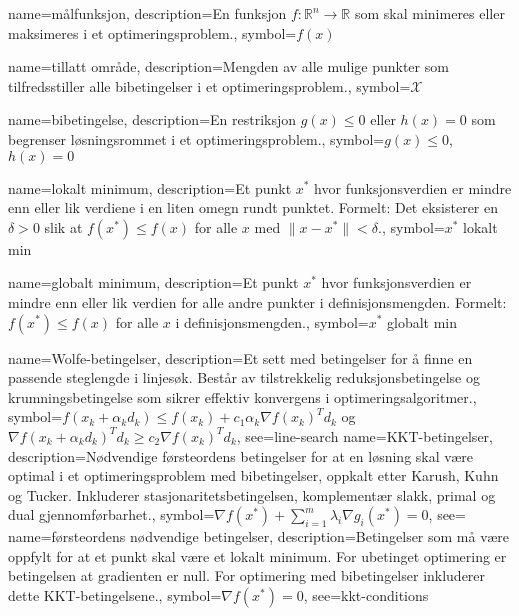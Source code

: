 {
    name=målfunksjon,
    description={En funksjon \( f\colon \mathbb{R}^n \to \mathbb{R} \) som skal minimeres eller maksimeres i et optimeringsproblem.},
    symbol={\( f(x) \)}
}

{
    name=tillatt område,
    description={Mengden av alle mulige punkter som tilfredsstiller alle bibetingelser i et optimeringsproblem.},
    symbol={\( \mathcal{X} \)}
}

{
    name=bibetingelse,
    description={En restriksjon \( g(x) \leq 0 \) eller \( h(x) = 0 \) som begrenser løsningsrommet i et optimeringsproblem.},
    symbol={\( g(x) \leq 0 \), \( h(x) = 0 \)}
}

{
    name=lokalt minimum,
    description={Et punkt \( x^* \) hvor funksjonsverdien er mindre enn eller lik verdiene i en liten omegn rundt punktet. Formelt: Det eksisterer en \( \delta > 0 \) slik at \( f(x^*) \leq f(x) \) for alle \( x \) med \( \|x - x^*\| < \delta \).},
    symbol={\( x^* \) lokalt min}
}

{
    name=globalt minimum,
    description={Et punkt \( x^* \) hvor funksjonsverdien er mindre enn eller lik verdien for alle andre punkter i definisjonsmengden. Formelt: \( f(x^*) \leq f(x) \) for alle \( x \) i definisjonsmengden.},
    symbol={\( x^* \) globalt min}
}


{
    name=Wolfe-betingelser,
    description={Et sett med betingelser for å finne en passende steglengde i linjesøk. Består av tilstrekkelig reduksjonsbetingelse og krumningsbetingelse som sikrer effektiv konvergens i optimeringsalgoritmer.},
    symbol={\( f(x_k + \alpha_k d_k) \leq f(x_k) + c_1 \alpha_k \nabla f(x_k)^T d_k \) og \( \nabla f(x_k + \alpha_k d_k)^T d_k \geq c_2 \nabla f(x_k)^T d_k \)},
    see={line-search}
}
{
    name=KKT-betingelser,
    description={Nødvendige førsteordens betingelser for at en løsning skal være optimal i et optimeringsproblem med bibetingelser, oppkalt etter Karush, Kuhn og Tucker. Inkluderer stasjonaritetsbetingelsen, komplementær slakk, primal og dual gjennomførbarhet.},
    symbol={\( \nabla f(x^*) + \sum_{i=1}^m \lambda_i \nabla g_i(x^*) = 0 \)},
    see={}
}
{
    name=førsteordens nødvendige betingelser,
    description={Betingelser som må være oppfylt for at et punkt skal være et lokalt minimum. For ubetinget optimering er betingelsen at gradienten er null. For optimering med bibetingelser inkluderer dette KKT-betingelsene.},
    symbol={\( \nabla f(x^*) = 0 \)},
    see={kkt-conditions}
}

